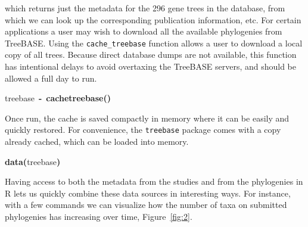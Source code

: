 \documentclass[authoryear, preprint]{elsarticle}
\makeatletter
\newcommand{\hlfunctioncall}[1]{\textcolor[rgb]{.5,0,.33}{\textbf{#1}}}%
\newcommand{\hlkeyword}[1]{\textbf{#1}}%
\newcommand{\hlassignement}[1]{\textbf{#1}}%
\newcommand{\hlsymbol}[1]{#1}%
\newenvironment{kframe}{%
 \def\FrameCommand##1{\hskip\@totalleftmargin \hskip-\fboxsep
 \colorbox{shadecolor}{##1}\hskip-\fboxsep
     \hskip-\linewidth \hskip-\@totalleftmargin \hskip\columnwidth}%
 \MakeFramed {\advance\hsize-\width
   \@totalleftmargin\z@ \linewidth\hsize
   \@setminipage}}%
 {\par\unskip\endMakeFramed}
\newenvironment{knitrout}{}{} %
\makeatother
\begin{document}
which returns just the metadata for the 296 gene trees in the database, from which we can look up the corresponding publication information, etc.  For certain applications a user may wish to download all the available phylogenies from TreeBASE. Using the \verb|cache_treebase| function allows a user to download a local copy of all trees.  Because direct database dumps are not available, this function has intentional delays to avoid overtaxing the TreeBASE servers, and should be allowed a full day to run.  
\begin{knitrout}
\color{fgcolor}\begin{kframe}
\begin{flushleft}
\ttfamily\noindent
\hlsymbol{treebase}{\ }\hlassignement{\usebox{\hlnormalsizeboxlessthan}-}{\ }\hlfunctioncall{cache\usebox{\hlnormalsizeboxunderscore}treebase}\hlkeyword{(}\hlkeyword{)}\mbox{}
\normalfont
\end{flushleft}
\end{kframe}
\end{knitrout}


Once run, the cache is saved compactly in memory where it can be easily and quickly restored.  For convenience, the \texttt{treebase} package comes with a copy already cached, which can be loaded into memory.
\begin{knitrout}
\color{fgcolor}\begin{kframe}
\begin{flushleft}
\ttfamily\noindent
\hlfunctioncall{data}\hlkeyword{(}\hlsymbol{treebase}\hlkeyword{)}\mbox{}
\normalfont
\end{flushleft}
\end{kframe}
\end{knitrout}

Having access to both the metadata from the studies and from the phylogenies in R lets us quickly combine these data sources in interesting ways.  For instance, with a few commands we can visualize how the number of taxa on submitted phylogenies has increasing over time, Figure~\ref{fig:2}.  

\end{document}
